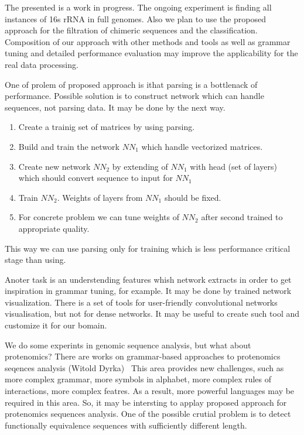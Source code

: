 \documentclass[a4paper,twoside]{article}
\begin{document}
\noindent The presented is a work in progress. 
The ongoing experiment is finding all instances of 16s rRNA in full genomes.
Also we plan to use the proposed approach for the filtration of chimeric sequences and the classification.
Composition of our approach with other methods and tools as well as grammar tuning and detailed performance evaluation may improve the applicability for the real data processing.

One of prolem of proposed approach is ithat parsing is a bottlenack of performance.
Possible solution is to construct network which can handle sequences, not parsing data.
It may be done by the next way.
\begin{enumerate}
\item Create a trainig set of matrices by using parsing.
\item Build and train the network $NN_1$ which handle vectorized matrices.
\item Create new network $NN_2$ by extending  of $NN_1$ with head (set of layers) which should convert sequence to input for $NN_1$
\item Train $NN_2$. Weights of layers from $NN_1$ should be fixed.
\item For concrete problem we can tune weights of $NN_2$ after second trained to appropriate quality.
\end{enumerate}
This way we can use parsing only for training which is less performance critical stage than using.

Anoter task is an understending features whish network extracts in order to get inspiration in grammar tuning, for example.
It may be done by trained network visualization.
There is a set of tools for user-friendly convolutional networks visualisation, but not for dense networks.
It may be useful to create such tool and customize it for our bomain.

We do some experints in genomic sequence analysis, but what about protenomics?
There are works on grammar-based approaches to protenomics seqences analysis (Witold Dyrka)~\cite{DBLP:Witold:Proteins}
This area provides new challenges, such as more complex grammar, more symbols in alphabet, more complex rules of interactions, more complex featres.
As a result, more powerful languages may be required in this area.
So, it may be intersting to applay proposed approach for protenomics sequences analysis.
One of the possible crutial problem is to detect functionally equivalence sequences with sufficiently different length.
\end{document}
